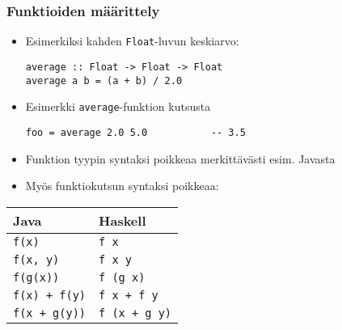 \documentclass{beamer}
\begin{document}
\begin{frame}[fragile]
\frametitle{Funktioiden määrittely}
\begin{itemize}
\item{Esimerkiksi kahden \texttt{Float}-luvun keskiarvo:}
\begin{verbatim}
average :: Float -> Float -> Float
average a b = (a + b) / 2.0
\end{verbatim}

\item{Esimerkki \texttt{average}-funktion kutsusta}
\begin{verbatim}
foo = average 2.0 5.0           -- 3.5
\end{verbatim}

\item{Funktion tyypin syntaksi poikkeaa merkittävästi esim. Javasta}
\item{Myös funktiokutsun syntaksi poikkeaa:}
\end{itemize}
\begin{center}
    \begin{tabular}[H]{l|l}
        Java                    &   Haskell         \\
        \hline
        \texttt{f(x)}           &   \texttt{f x}            \\
        \texttt{f(x, y)}        &   \texttt{f x y}          \\
        \texttt{f(g(x))}        &   \texttt{f (g x)}        \\
        \texttt{f(x) + f(y)}    &   \texttt{f x + f y}      \\
        \texttt{f(x + g(y))}    &   \texttt{f (x + g y)}    \\
    \end{tabular}
\end{center}
\end{frame}
\end{document}
